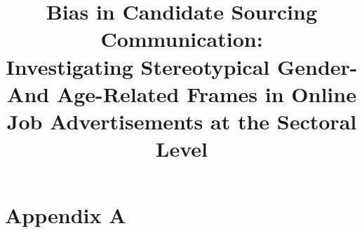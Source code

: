 \documentclass[man]{apa7}
\title{Bias in Candidate Sourcing Communication:\\
Investigating Stereotypical Gender- And Age-Related Frames in Online Job Advertisements at the Sectoral Level}
\begin{document}
\appendix
\section{Appendix A}
\label{app:A}

\end{document}
